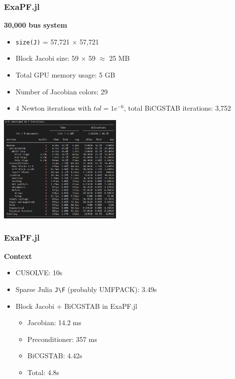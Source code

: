 \begin{frame}[fragile]
  \frametitle{ExaPF.jl}
  {\bf 30,000 bus system}
  \begin{itemize}
    \item \lstinline{size(J)} = 57,721 $\times$ 57,721 
    \item Block Jacobi size: 59 $\times$ 59 $\approx$ 25 MB
    \item Total GPU memory usage: 5 GB
    \item Number of Jacobian colors: 29
    \item 4 Newton iterations with $tol = 1e^{-6}$, total BiCGSTAB iterations: 3,752 
  \end{itemize}
  \begin{center}
   \includegraphics[width=0.45\textwidth]{figures/timings}
  \end{center}
\end{frame}

\begin{frame}
  \frametitle{ExaPF.jl}
  {\bf Context}
  \begin{itemize}
    \item CUSOLVE: 10s 
    \item Sparse Julia \lstinline{J\F} (probably UMFPACK): 3.49s 
    \item Block Jacobi + BiCGSTAB in ExaPF.jl
    \begin{itemize}
      \item Jacobian: 14.2 ms
      \item Preconditioner: 357 ms
      \item BiCGSTAB: 4.42s
      \item Total: 4.8s
    \end{itemize}
  \end{itemize}
\end{frame}

